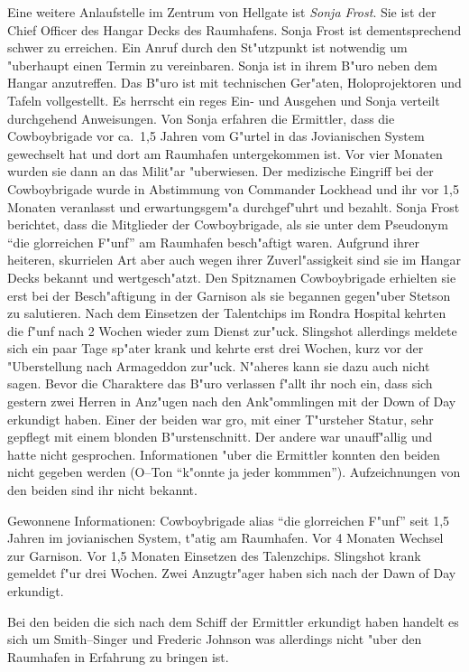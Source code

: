 Eine weitere Anlaufstelle im Zentrum von Hellgate ist \emph{Sonja Frost}. Sie ist der Chief Officer des Hangar Decks des Raumhafens. Sonja Frost ist dementsprechend schwer zu erreichen. Ein Anruf durch den St"utzpunkt ist notwendig um "uberhaupt einen Termin zu vereinbaren. Sonja ist in ihrem B"uro neben dem Hangar anzutreffen. Das B"uro ist mit technischen Ger"aten, Holoprojektoren und Tafeln vollgestellt. Es herrscht ein reges Ein- und Ausgehen und Sonja verteilt durchgehend Anweisungen. Von Sonja erfahren die Ermittler, dass die Cowboybrigade vor ca.~1,5 Jahren vom G"urtel in das Jovianischen System gewechselt hat und dort am Raumhafen untergekommen ist. Vor vier Monaten wurden sie dann an das Milit"ar "uberwiesen. Der medizische Eingriff bei der Cowboybrigade wurde in Abstimmung von Commander Lockhead und ihr vor 1,5 Monaten veranlasst und erwartungsgem"a\3 durchgef"uhrt und bezahlt. Sonja Frost berichtet, dass die Mitglieder der Cowboybrigade, als sie unter dem Pseudonym "`die glorreichen F"unf"' am Raumhafen besch"aftigt waren. Aufgrund ihrer heiteren, skurrielen Art aber auch wegen ihrer Zuverl"assigkeit sind sie im Hangar Decks bekannt und wertgesch"atzt.  Den Spitznamen Cowboybrigade erhielten sie erst bei der Besch"aftigung in der Garnison als sie begannen gegen"uber Stetson zu salutieren. Nach dem Einsetzen der Talentchips im Rondra Hospital kehrten die f"unf nach 2 Wochen wieder zum Dienst zur"uck. Slingshot allerdings meldete sich ein paar Tage sp"ater krank und kehrte erst drei Wochen, kurz vor der "Uberstellung nach Armageddon zur"uck. N"aheres kann sie dazu auch nicht sagen. Bevor die Charaktere das B"uro verlassen f"allt ihr noch ein, dass sich gestern zwei Herren in Anz"ugen nach den Ank"ommlingen mit der Down of Day erkundigt haben. Einer der beiden war gro\3, mit einer T"ursteher Statur, sehr gepflegt mit einem blonden B"urstenschnitt. Der andere war unauff"allig und hatte nicht gesprochen. Informationen "uber die Ermittler konnten den beiden nicht gegeben werden (O--Ton "`k"onnte ja jeder kommmen"'). Aufzeichnungen von den beiden sind ihr nicht bekannt.


\begin{remarks}
	Gewonnene Informationen: Cowboybrigade alias "`die glorreichen F"unf"' seit 1,5 Jahren im jovianischen System, t"atig am Raumhafen. Vor 4 Monaten Wechsel zur Garnison. Vor 1,5 Monaten Einsetzen des Talenzchips. Slingshot krank gemeldet f"ur drei Wochen. Zwei Anzugtr"ager haben sich nach der Dawn of Day erkundigt.

	Bei den beiden die sich nach dem Schiff der Ermittler erkundigt haben handelt es sich um Smith--Singer und Frederic Johnson was allerdings nicht "uber den Raumhafen in Erfahrung zu bringen ist.
\end{remarks}


